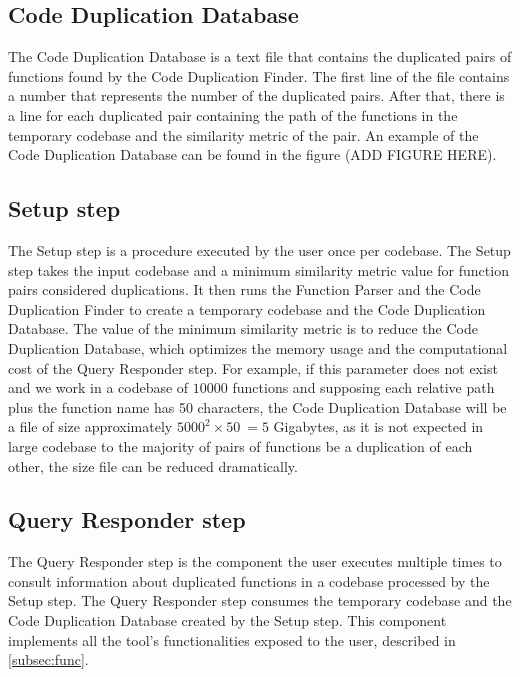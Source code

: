 \subsection{Code Duplication Database}

The Code Duplication Database is a text file that contains the duplicated pairs of 
functions found by the Code Duplication Finder. The first line of the file contains 
a number that represents the number of the duplicated pairs. After that, there is a 
line for each duplicated pair containing the path of the functions in the temporary codebase 
and the similarity metric of the pair. An example of the Code Duplication Database can be 
found in the figure (ADD FIGURE HERE).

\subsection{Setup step}

\label{subsec:setup}

The Setup step is a procedure executed by the user once per codebase. The Setup step takes 
the input codebase and a minimum similarity metric value for function pairs considered 
duplications. It then runs the Function Parser and the Code Duplication Finder to create 
a temporary codebase and the Code Duplication Database. The value of the minimum similarity 
metric is to reduce the Code Duplication Database, which optimizes the memory usage and the 
computational cost of the Query Responder step. For example, if this parameter does not exist 
and we work in a codebase of $10000$ functions and supposing each relative path plus the 
function name has 50 characters, the Code Duplication Database will be a file of size 
approximately $5000^2 \times 50 ~= 5$ Gigabytes, as it is not expected in large codebase 
to the majority of pairs of functions be a duplication of each other, 
the size file can be reduced dramatically.

\subsection{Query Responder step}

The Query Responder step is the component the user executes multiple times to consult information 
about duplicated functions in a codebase processed by the Setup step. The Query Responder step 
consumes the temporary codebase and the Code Duplication Database created by the Setup step. 
This component implements all the tool’s functionalities exposed to the user, described in 
\ref{subsec:func}.
